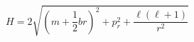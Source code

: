 \begin{equation}                                
H=2\sqrt{(m+\frac{1}{2}br)^{2}+p^{2}_{r}+\frac{\ell(\ell+1)}{r^{2}}}                                
\end{equation} 
